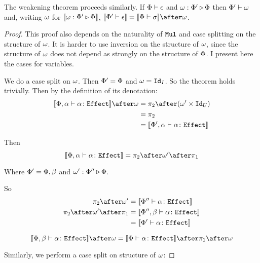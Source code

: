 \documentclass{Report}
\begin{document}
\begin{theorem}\label{EffWeakeningEff}
    The weakening theorem proceeds similarly. If $\wellformed{\P}{\e}$ and $\wrelw{\P'}{\P}$ then $\wellformed{\P'}{\w}$ and, writing $\w$ for $\deno{\wrelw{\P'}{\P}}$,  $\deno{\wellformed{\P'}{\e}} = \deno{\wellformed{\P}{\si}}\after\w$.

\end{theorem}

\begin{proof}
    This proof also depends on the naturality of $\Mul$ and case splitting on the structure of $\w$. It is harder to use inversion on the structure of $\w$, since the structure of $\w$ does not depend as strongly on the structure of $\P$. I present here the cases for variables.

    We do a case split on $\w$.
    \subcase{$\w = \i$}
    Then $\P' = \P$ and $\w = \Id{I}$. So the theorem holds trivially.
    Then by the definition of its denotation:    
    \begin{align}
        \deno{\typerelation{\P,\a}{\a}{\effect}}\after\w &= \pp\after(\w'\times \Id{U}) \\
        & = \pp\\
        & = \deno{\typerelation{\P',\a}{\a}{\effect}}
    \end{align}
    
    Then \begin{equation}
        \deno{\typerelation{\P,\a}{\a}{\effect}} = \pp\after\w'\after\p
    \end{equation}
    
    Where $\P' = \P,\b$ and $\wrel{\w'}{\P''}{\P}$.
    
    So\begin{align}
        \pp\after\w' & = \deno{\typerelation{\P''}{\a}{\effect}}
        \\
        \pp\after\w'\after\p & =\deno{\typerelation{\P'',\b}{\a}{\effect}}\\
        &= \deno{\typerelation{\P'}{\a}{\effect}}
    \end{align}
    
    \begin{equation}
        \deno{\typerelation{\P,\b}{\a}{\effect}}\after\w = \deno{\typerelation{\P}{\a}{\effect}}\after\p\after\w
    \end{equation}
    
    Similarly, we perform a case split on structure of $\w$:
    

\end{proof}
\end{document}
